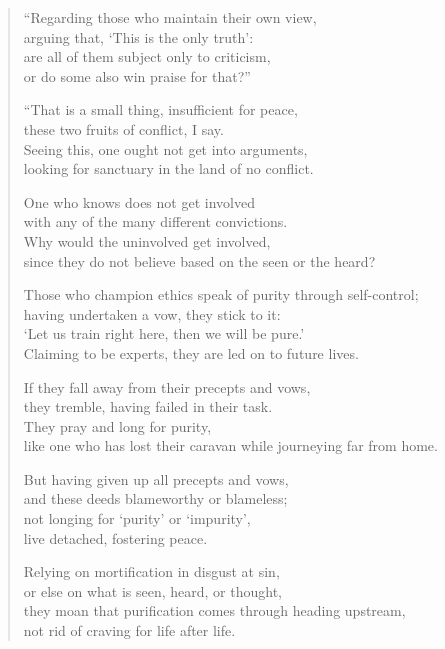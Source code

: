 \documentclass[12pt,openany]{book}%
\begin{document}
\begin{verse}%
“Regarding those who maintain their own view, \\
arguing that, ‘This is the only truth’: \\
are all of them subject only to criticism, \\
or do some also win praise for that?” 

“That is a small thing, insufficient for peace, \\
these two fruits of conflict, I say. \\
Seeing this, one ought not get into arguments, \\
looking for sanctuary in the land of no conflict. 

One who knows does not get involved \\
with any of the many different convictions. \\
Why would the uninvolved get involved, \\
since they do not believe based on the seen or the heard? 

Those who champion ethics speak of purity through self-control; \\
having undertaken a vow, they stick to it: \\
‘Let us train right here, then we will be pure.’ \\
Claiming to be experts, they are led on to future lives. 

If they fall away from their precepts and vows, \\
they tremble, having failed in their task. \\
They pray and long for purity, \\
like one who has lost their caravan while journeying far from home. 

But having given up all precepts and vows, \\
and these deeds blameworthy or blameless; \\
not longing for ‘purity’ or ‘impurity’, \\
live detached, fostering peace. 

Relying on mortification in disgust at sin, \\
or else on what is seen, heard, or thought, \\
they moan that purification comes through heading upstream, \\
not rid of craving for life after life. 


\end{verse}
\end{document}
